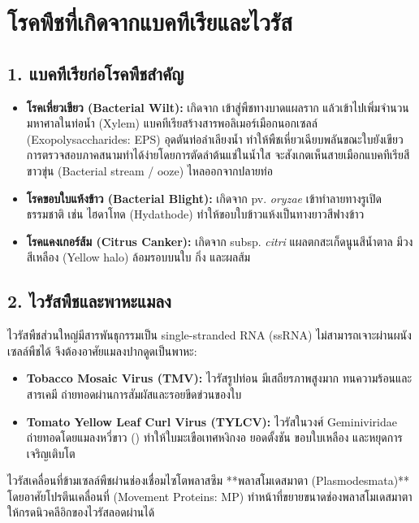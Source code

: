 \section{โรคพืชที่เกิดจากแบคทีเรียและไวรัส}

\subsection{1. แบคทีเรียก่อโรคพืชสำคัญ}
\begin{itemize}
    \item \textbf{โรคเหี่ยวเขียว (Bacterial Wilt):} เกิดจาก  เข้าสู่พืชทางบาดแผลราก แล้วเข้าไปเพิ่มจำนวนมหาศาลในท่อน้ำ (Xylem) แบคทีเรียสร้างสารพอลิเมอร์เมือกนอกเซลล์ (Exopolysaccharides: EPS) อุดตันท่อลำเลียงน้ำ ทำให้พืชเหี่ยวเฉียบพลันขณะใบยังเขียว การตรวจสอบภาคสนามทำได้ง่ายโดยการตัดลำต้นแช่ในน้ำใส จะสังเกตเห็นสายเมือกแบคทีเรียสีขาวขุ่น (Bacterial stream / ooze) ไหลออกจากปลายท่อ
    \item \textbf{โรคขอบใบแห้งข้าว (Bacterial Blight):} เกิดจาก  pv. \textit{oryzae} เข้าทำลายทางรูเปิดธรรมชาติ เช่น ไฮดาโทด (Hydathode) ทำให้ขอบใบข้าวแห้งเป็นทางยาวสีฟางข้าว
    \item \textbf{โรคแคงเกอร์ส้ม (Citrus Canker):} เกิดจาก  subsp. \textit{citri} แผลตกสะเก็ดนูนสีน้ำตาล มีวงสีเหลือง (Yellow halo) ล้อมรอบบนใบ กิ่ง และผลส้ม
\end{itemize}

\subsection{2. ไวรัสพืชและพาหะแมลง}
ไวรัสพืชส่วนใหญ่มีสารพันธุกรรมเป็น single-stranded RNA (ssRNA) ไม่สามารถเจาะผ่านผนังเซลล์พืชได้ จึงต้องอาศัยแมลงปากดูดเป็นพาหะ:
\begin{itemize}
    \item \textbf{Tobacco Mosaic Virus (TMV):} ไวรัสรูปท่อน มีเสถียรภาพสูงมาก ทนความร้อนและสารเคมี ถ่ายทอดผ่านการสัมผัสและรอยขีดข่วนของใบ
    \item \textbf{Tomato Yellow Leaf Curl Virus (TYLCV):} ไวรัสในวงศ์ Geminiviridae ถ่ายทอดโดยแมลงหวี่ขาว () ทำให้ใบมะเขือเทศหงิกงอ ยอดตั้งชัน ขอบใบเหลือง และหยุดการเจริญเติบโต
\end{itemize}
ไวรัสเคลื่อนที่ข้ามเซลล์พืชผ่านช่องเชื่อมไซโตพลาสซึม **พลาสโมเดสมาตา (Plasmodesmata)** โดยอาศัยโปรตีนเคลื่อนที่ (Movement Proteins: MP) ทำหน้าที่ขยายขนาดช่องพลาสโมเดสมาตาให้กรดนิวคลีอิกของไวรัสลอดผ่านได้

